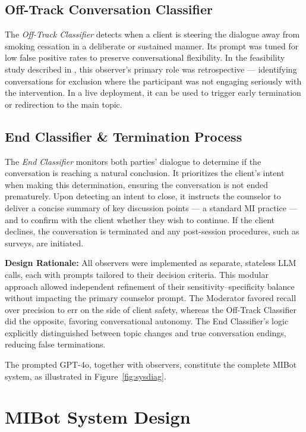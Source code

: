 \subsection{Off-Track Conversation Classifier}
The \textit{Off-Track Classifier} detects when a client is steering the dialogue away from smoking cessation in a deliberate or sustained manner. Its prompt was tuned for low false positive rates to preserve conversational flexibility. In the feasibility study described in , this observer's primary role was retrospective --- identifying conversations for exclusion where the participant was not engaging seriously with the intervention. In a live deployment, it can be used to trigger early termination or redirection to the main topic.

\subsection{End Classifier \& Termination Process}
The \textit{End Classifier} monitors both parties' dialogue to determine if the conversation is reaching a natural conclusion. It prioritizes the client's intent when making this determination, ensuring the conversation is not ended prematurely. Upon detecting an intent to close, it instructs the counselor to deliver a concise summary of key discussion points --- a standard MI practice --- and to confirm with the client whether they wish to continue. If the client declines, the conversation is terminated and any post-session procedures, such as surveys, are initiated.


\textbf{Design Rationale:} All observers were implemented as separate, stateless LLM calls, each with prompts tailored to their decision criteria. This modular approach allowed independent refinement of their sensitivity–specificity balance without impacting the primary counselor prompt. The Moderator favored recall over precision to err on the side of client safety, whereas the Off-Track Classifier did the opposite, favoring conversational autonomy. The End Classifier's logic explicitly distinguished between topic changes and true conversation endings, reducing false terminations.


The prompted GPT-4o, together with observers, constitute the complete MIBot system, as illustrated in Figure~\ref{fig:sysdiag}.


\section{MIBot System Design}
\label{sec:deployment}



